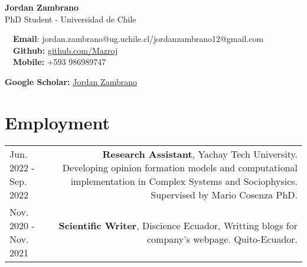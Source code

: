 \documentclass{article}
\begin{document}
\small %

\begin{center}
\huge
\textbf{Jordan Zambrano} \\
\normalsize
PhD Student - Universidad de Chile \\
\end{center}

\begin{minipage}[ht]{0.6\linewidth}
	\faEnvelope~~\textbf{Email}: jordan.zambrano@ug.uchile.cl/jordanzambrano12@gmail.com \\
	\faGithub~~\textbf{Github:} \href{https://github.com/Mazroj}{github.com/Mazroj}\\
  \faPhone~~\textbf{Mobile:} +593 986989747 \\
\end{minipage}
\begin{minipage}[ht]{0.34\linewidth}
	\begin{flushright}
    \textbf{Google Scholar:} \href{https://scholar.google.com/citations?user=XTLj31oAAAAJ&hl=es}{Jordan Zambrano} \\
	\end{flushright}
\end{minipage}

\section*{Employment}

\begin{tabular}{L!{\vrule}R}
    
    Jun. 2022 - Sep. 2022 & \textbf{Research Assistant}, Yachay Tech University. Developing opinion formation models and computational implementation in Complex Systems and Sociophysics. Supervised by Mario Cosenza PhD.\\
    Nov. 2020 - Nov. 2021 & \textbf{Scientific Writer}, Discience Ecuador, Writting blogs for company's webpage. Quito-Ecuador. \\
\end{tabular}
\end{document}

